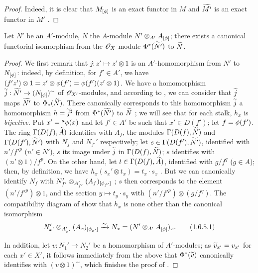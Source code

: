 \begin{proof}
\label{proof-1.1.6.4}
Indeed, it is clear that $M_{[\phi]}$ is an exact functor in $M$ and $\widetilde{M'}$ is an
exact functor in $M'$ .
\end{proof}

\begin{prop}[1.6.5]
\label{1.1.6.5}
Let $N'$ be an $A'$-module, $N$ the $A$-module $N'\otimes_{A'}A_{[\phi]}$; there exists a
canonical functorial isomorphism from the $\mathscr{O}_X$-module $\Phi^*(\widetilde{N'})$ to
$\widetilde{N}$.
\end{prop}

\begin{proof}
\label{proof-1.1.6.5}
We first remark that $j:z'\mapsto z'\otimes 1$ is an $A'$-homomorphism from $N'$ to
$N_{[\phi]}$: indeed, by definition, for $f'\in A'$, we have
$(f' z')\otimes 1=z'\otimes\phi(f')=\phi(f')(z'\otimes 1)$. We have  a
homomorphism $\widetilde{j}:\widetilde{N'}\to(N_{[\phi]})^\sim$ of $\mathscr{O}_{X'}$-modules, and
according to , we can consider that $\widetilde{j}$ maps $\widetilde{N'}$
to $\Phi_*(\widetilde{N})$. There canonically corresponds to this homomorphism
$\widetilde{j}$ a homomorphism $h=\widetilde{j}^\sharp$ from $\Phi^*(\widetilde{N'})$ to
$\widetilde{N}$ ; we will see that for each stalk, $h_x$ is \emph{bijective}.
Put $x'={}^a\phi(x)$ and let $f'\in A'$ be such that $x'\in D(f')$; let $f=\phi(f')$. The
ring $\Gamma(D(f),\widetilde{A})$ identifies with $A_f$, the modules
$\Gamma(D(f),\widetilde{N})$ and $\Gamma(D(f'),\widetilde{N'})$ with $N_f$ and $N_{f'}'$
respectively; let $s\in\Gamma(D(f'),\widetilde{N'})$, identified with $n'/{f'}^p$
($n'\in N'$), $s$ its image under $\widetilde{j}$ in $\Gamma(D(f),\widetilde{N})$; $s$
identifies with $(n'\otimes 1)/f^p$. On the other hand, let $t\in\Gamma(D(f),\widetilde{A})$,
identified with $g/f^q$ ($g\in A$); then, by definition, we have
$h_x(s_x'\otimes t_x)=t_x\cdot s_x$ . But we can canonically identify $N_f$
with $N_{f'}'\otimes_{A_{f'}'}(A_f)_{[\phi_{f'}]}$ ; $s$ then corresponds
to the element $(n'/{f'}^p)\otimes 1$, and the section $y\mapsto t_y\cdot s_y$ with
$(n'/{f'}^p)\otimes(g/f^q)$. The compatibility diagram of  show that $h_x$
is none other than the canonical isomorphism
\[
  N_{x'}'\otimes_{A_{x'}'}(A_x)_{[\phi_{x'}]}\xrightarrow{\sim} N_x=(N'\otimes_{A'}A_{[\phi]})_x.
  \tag{1.6.5.1}
\]

In addition, let $v:N_1'\to N_2'$ be a homomorphism of $A'$-modules; as
$\widetilde{v}_{x'}=v_{x'}$ for each $x'\in X'$, it follows immediately from the above that
$\Phi^*(\widetilde{v})$ canonically identifies with $(v\otimes 1)^\sim$, which finishes the
proof of .
\end{proof}


